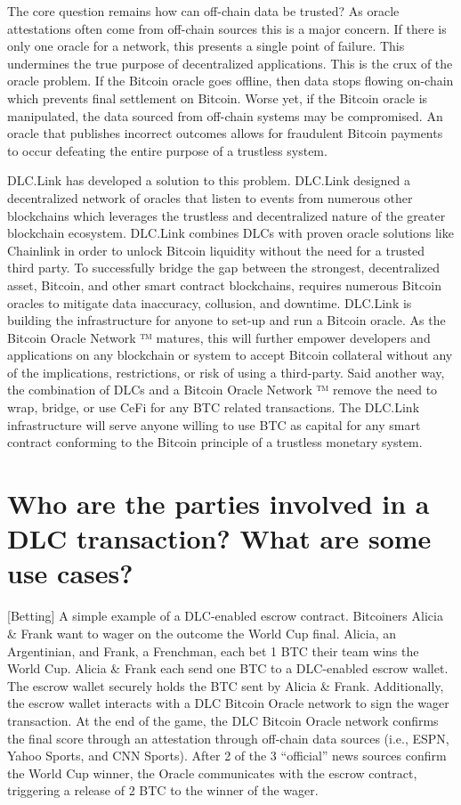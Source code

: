 \documentclass[twoside, a4paper, 11pt]{article}
\begin{document}
  The core question remains how can off-chain data be trusted? As oracle attestations often come from off-chain sources this is a major concern. If there is only one oracle for a network, this presents a single point of failure. This undermines the true purpose of decentralized applications. This is the crux of the oracle problem. If the Bitcoin oracle goes offline, then data stops flowing on-chain which prevents final settlement on Bitcoin. Worse yet, if the Bitcoin oracle is manipulated, the data sourced from off-chain systems may be compromised. An oracle that publishes incorrect outcomes allows for fraudulent Bitcoin payments to occur defeating the entire purpose of a trustless system.

  DLC.Link has developed a solution to this problem. DLC.Link designed a decentralized network of oracles that listen to events from numerous other blockchains which leverages the trustless and decentralized nature of the greater blockchain ecosystem. DLC.Link combines DLCs with proven oracle solutions like Chainlink in order to unlock Bitcoin liquidity without the need for a trusted third party. To successfully bridge the gap between the strongest, decentralized asset, Bitcoin, and other smart contract blockchains, requires numerous Bitcoin oracles to mitigate data inaccuracy, collusion, and downtime. DLC.Link is building the infrastructure for anyone to set-up and run a Bitcoin oracle. As the Bitcoin Oracle Network ™ matures, this will further empower developers and applications on any blockchain or system to accept Bitcoin collateral without any of the implications, restrictions, or risk of using a third-party. Said another way, the combination of DLCs and a Bitcoin Oracle Network ™ remove the need to wrap, bridge, or use CeFi for any BTC related transactions. The DLC.Link infrastructure will serve anyone willing to use BTC as capital for any smart contract conforming to the Bitcoin principle of a trustless monetary system.

  \section{Who are the parties involved in a DLC transaction? What are some use cases?}

  [Betting] A simple example of a DLC-enabled escrow contract. Bitcoiners Alicia \& Frank want to wager on the outcome the World Cup final. Alicia, an Argentinian, and Frank, a Frenchman, each bet 1 BTC their team wins the World Cup. Alicia \& Frank each send one BTC to a DLC-enabled escrow wallet. The escrow wallet securely holds the BTC sent by Alicia \& Frank. Additionally, the escrow wallet interacts with a DLC Bitcoin Oracle network to sign the wager transaction. At the end of the game, the DLC Bitcoin Oracle network confirms the final score through an attestation through off-chain data sources (i.e., ESPN, Yahoo Sports, and CNN Sports). After 2 of the 3 “official” news sources confirm the World Cup winner, the Oracle communicates with the escrow contract, triggering a release of 2 BTC to the winner of the wager.
\end{document}
